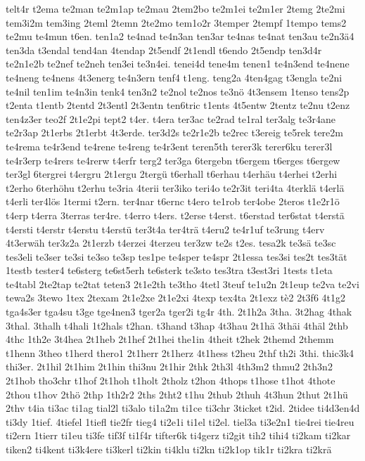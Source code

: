 {telt4r
t2ema
te2man
te2m1ap
te2mau
2tem2bo
te2m1ei
te2m1er
2temg
2te2mi
tem3i2m
tem3ing
2teml
2temn
2te2mo
tem1o2r
3temper
2tempf
1tempo
tems2
te2mu
te4mun
t6en.
ten1a2
te4nad
te4n3an
ten3ar
te4nas
te4nat
ten3au
te2n3ä4
ten3da
t3endal
tend4an
4tendap
2t5endf
2t1endl
t6endo
2t5endp
ten3d4r
te2n1e2b
te2nef
te2neh
ten3ei
te3n4ei.
tenei4d
tene4m
tenen1
te4n3end
te4nene
te4neng
te4nens
4t3energ
te4n3ern
tenf4
t1eng.
teng2a
4ten4gag
t3engla
te2ni
te4nil
ten1im
te4n3in
tenk4
ten3n2
te2nol
te2nos
te3nö
4t3ensem
1tenso
tens2p
t2enta
t1entb
2tentd
2t3entl
2t3entn
ten6tric
t1ents
4t5entw
2tentz
te2nu
t2enz
ten4z3er
teo2f
2t1e2pi
tept2
t4er.
t4era
ter3ac
te2rad
te1ral
ter3alg
te3r4ane
te2r3ap
2t1erbs
2t1erbt
4t3erde.
ter3d2s
te2r1e2b
te2rec
t3ereig
te5rek
tere2m
te4rema
te4r3end
te4rene
te4reng
te4r3ent
teren5th
terer3k
terer6ku
terer3l
te4r3erp
te4rers
te4rerw
t4erfr
terg2
ter3ga
6tergebn
t6ergem
t6erges
t6ergew
ter3gl
6tergrei
t4ergru
2t1ergu
2tergü
t6erhall
t6erhau
t4erhäu
t4erhei
t2erhi
t2erho
6terhöhu
t2erhu
te3ria
4terii
ter3iko
teri4o
te2r3it
teri4ta
4terklä
t4erlä
t4erli
ter4lös
1termi
t2ern.
ter4nar
t6ernc
t4ero
te1rob
ter4obe
2teros
t1e2r1ö
t4erp
t4erra
3terras
ter4re.
t4erro
t4ers.
t2erse
t4erst.
t6erstad
ter6stat
t4erstä
t4ersti
t4erstr
t4erstu
t4erstü
ter3t4a
ter4trä
t4eru2
te4r1uf
te3rung
t4erv
4t3erwäh
ter3z2a
2t1erzb
t4erzei
4terzeu
ter3zw
te2s
t2es.
tesa2k
te3sä
te3sc
tes3eli
te3ser
te3si
te3so
te3sp
tes1pe
te4sper
te4spr
2t1essa
tes3si
tes2t
tes3tät
1testb
tester4
te6sterg
te6st5erh
te6sterk
te3sto
tes3tra
t3est3ri
1tests
t1eta
te4tabl
2te2tap
te2tat
teten3
2t1e2th
te3tho
4tetl
3teuf
te1u2n
2t1eup
te2va
te2vi
tewa2s
3tewo
1tex
2texam
2t1e2xe
2t1e2xi
4texp
tex4ta
2t1exz
tè2
2t3f6
4t1g2
tga4s3er
tga4su
t3ge
tge4nen3
tger2a
tger2i
tg4r
4th.
2t1h2a
3tha.
3t2hag
4thak
3thal.
3thalh
t4hali
1t2hals
t2han.
t3hand
t3hap
4t3hau
2t1hä
3thäi
4thäl
2thb
4thc
1th2e
3t4hea
2t1heb
2t1hef
2t1hei
the1in
4theit
t2hek
2themd
2themm
t1henn
3theo
t1herd
thero1
2t1herr
2t1herz
4t1hess
t2heu
2thf
th2i
3thi.
thic3k4
thi3er.
2t1hil
2t1him
2t1hin
thi3nu
2t1hir
2thk
2th3l
4th3m2
thmu2
2th3n2
2t1hob
tho3chr
t1hof
2t1hoh
t1holt
2tholz
t2hon
4thops
t1hose
t1hot
4thote
2thou
t1hov
2thö
2thp
1th2r2
2ths
2tht2
t1hu
2thub
2thuh
4t3hun
2thut
2t1hü
2thv
t4ia
ti3ac
ti1ag
tial2l
ti3alo
ti1a2m
ti1ce
ti3chr
3ticket
t2id.
2tidee
ti4d3en4d
ti3dy
1tief.
4tiefel
1tiefl
tie2fr
tieg4
ti2e1i
ti1el
ti2el.
tiel3a
ti3e2n1
tie4rei
tie4reu
ti2ern
1tierr
ti1eu
ti3fe
tif3f
ti1f4r
tifter6k
ti4gerz
ti2git
tih2
tihi4
ti2kam
ti2kar
tiken2
ti4kent
ti3k4ere
ti3kerl
ti2kin
ti4klu
ti2kn
ti2k1op
tik1r
ti2kra
ti2krä
}
